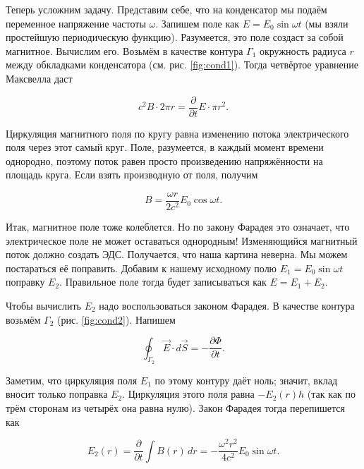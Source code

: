 \documentclass[11pt,a4paper]{article}
\numberwithin{equation}{section}
\newcommand{\pt}{\partial}
\begin{document}
Теперь усложним задачу. Представим себе, что на конденсатор мы подаём
переменное напряжение частоты $\omega$. Запишем поле как $E=E_0 \sin
\omega t$ (мы взяли простейшую периодическую функцию). Разумеется, это
поле создаст за собой магнитное. Вычислим его. Возьмём в качестве
контура $\Gamma_1$ окружность радиуса $r$ между обкладками
конденсатора (см. рис. \ref{fig:cond1}). Тогда четвёртое уравнение Максвелла даст

\begin{equation}
  \label{eq:cond_1}
  c^2 B \cdot 2 \pi r = \frac{\pt}{\pt t} E \cdot \pi r^2.
\end{equation}

Циркуляция магнитного поля по кругу равна изменению потока
электрического поля через этот самый круг. Поле, разумеется, в каждый
момент времени однородно, поэтому поток равен просто произведению
напряжённости на площадь круга. Если взять производную от поля,
получим

\begin{equation}
  \label{eq:cond_2}
  B = \frac{\omega r}{2c^2} E_0 \cos \omega t.
\end{equation}

Итак, магнитное поле тоже колеблется. Но по закону Фарадея это
означает, что электрическое поле не может оставаться однородным!
Изменяющийся магнитный поток должно создать ЭДС. Получается, что наша
картина неверна. Мы можем постараться её поправить. Добавим к
нашему исходному полю $E_1=E_0 \sin \omega t$ поправку
$E_2$. Правильное поле тогда будет записываться как $E=E_1+E_2$. 

Чтобы вычислить $E_2$ надо воспользоваться законом Фарадея. В качестве
контура возьмём $\Gamma_2$ (рис. \ref{fig:cond2}). Напишем 

\begin{equation}
  \label{eq:cond_3}
  \oint_{\Gamma_2} \vec{E} \cdot d \vec{S} = -\frac{\pt \Phi}{\pt t}.
\end{equation}

Заметим, что циркуляция поля $E_1$ по этому контуру даёт ноль; значит,
вклад вносит только поправка $E_2$. Циркуляция этого поля равна
$-E_2(r) h$ (так как по трём сторонам из четырёх она равна
нулю). Закон Фарадея тогда перепишется как

\begin{equation}
  \label{eq:cond_4}
  E_2 (r) = \frac{\pt}{\pt t} \int B(r)\, dr = -\frac{\omega^2
    r^2}{4c^2} E_0 \sin \omega t.
\end{equation}
\end{document}
